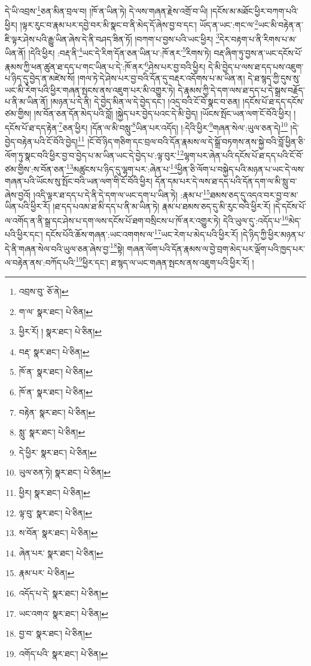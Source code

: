 དེ་ཡི་འབྲས་\footnote{འབྲས་བུ་  ཅོ་ནེ། }ཅན་མིན་བྲལ་བ། །ཁོ་ན་ཡིན་ཏེ། དེ་ལས་གཞན་རྗེས་འགྲོ་བ་ཡི། །དངོས་མ་མཐོང་ཕྱིར་བཀག་པའི་ཕྱིར། །ལྟར་རུང་བ་རྣམ་པར་དབྱེ་བར་མི་སྣང་བ་ནི་མེད་དོ་ཞེས་བྱ་བ་དང་། ཡོད་ན་ཡང་:གང་ལ་\footnote{ག་ལ་  སྣར་ཐང་།  པེ་ཅིན། }ཡང་མི་བརྟེན་ན་ཇི་ལྟར་ཤེས་པའི་རྒྱུ་ཡིན་ཞེས་དེ་ནི་བཤད་ཟིན་ཏོ། །བཀག་པ་བྱས་པའི་ཡང་ཕྱིར། \footnote{ཕྱིར་རོ། །   སྣར་ཐང་།  པེ་ཅིན། }དེར་བརྟག་པ་ནི་རིགས་པ་མ་ཡིན་ནོ། །དེའི་ཕྱིར། :བརྡ་ནི་\footnote{བརྡ་  སྣར་ཐང་།  པེ་ཅིན། }ཡང་དེ་རིག་དོན་ཅན་ཡིན་པ་:ཁོ་ནར་\footnote{ཁོ་ན་  སྣར་ཐང་།  པེ་ཅིན། }རིགས་ཏེ། བརྡ་ཞིག་ཏུ་བྱས་ན་ཡང་དངོས་པོ་རྣམས་ཀྱི་ཕན་ཚུན་ཐ་དད་པ་གང་ཡིན་པ་དེ་:ཁོ་ནར་\footnote{ཁོ་ན་  སྣར་ཐང་།  པེ་ཅིན། }ཤེས་པར་བྱ་བའི་ཕྱིར། དེ་མི་བྱེད་པ་ལས་ཐ་དད་པས་འཇུག་པ་ཉིད་དུ་བྱེད་ན་མཛེས་སོ། །གལ་ཏེ་དེ་ཤེས་པར་བྱ་བའི་དོན་དུ་བརྡར་འདོགས་པ་མ་ཡིན་ན། དེ་ཐ་སྙད་ཀྱི་དུས་སུ་ཡང་མི་རེག་པའི་ཕྱིར་གཞན་སྤངས་ནས་འཇུག་པར་མི་འགྱུར་ཏེ། དེ་རྣམས་ཀྱི་དེ་དག་ལས་ཐ་དད་པ་དེ་སྒྲས་བརྗོད་པ་ནི་མ་ཡིན་ནོ། །མཉན་པ་དེ་ནི། དེ་བྱེད་མིན་ལ་དེ་བྱེད་དང་། །འདྲ་བའི་ངོ་བོ་སྣང་བ་ཅན། །དངོས་པོ་ཐ་དད་དངོས་ཙམ་གྱིས། །ས་བོན་ཅན་དོན་མེད་པའི་བློ། །སྐྱེད་པར་བྱེད་པའང་དེ་མི་བྱེད། །ཡོངས་སྤོང་ཡན་ལག་ངོ་བོའི་ཕྱིར། །དངོས་པོ་ཐ་དད་རྟེན་\footnote{བརྟེན་  སྣར་ཐང་།  པེ་ཅིན། }ཅན་ཕྱིར། །དོན་ལ་མི་བསླུ་\footnote{སླུ་  སྣར་ཐང་།  པེ་ཅིན། }ཡིན་པར་འདོད། །:དེའི་ཕྱིར་\footnote{དེ་ཕྱིར་  སྣར་ཐང་།  པེ་ཅིན། }གཞན་སེལ་:ཡུལ་ཅན་དེ།\footnote{ཡུལ་ཅན་ཏེ།  སྣར་ཐང་།  པེ་ཅིན། } །དེ་བྱེད་བརྟེན་པའི་ངོ་བོའི་བྱེད།\footnote{ཕྱིར།  སྣར་ཐང་།  པེ་ཅིན། } །ངོ་བོ་ཉིད་གཅིག་དང་བྲལ་བའི་དོན་རྣམས་ལ་དེ་སྒྲོ་བཏགས་ནས་སྐྱེ་བའི་བློ་ཕྱིན་ཅི་ལོག་ཏུ་སྣང་བའི་ཕྱིར་བྱ་བ་བྱེད་པ་མ་ཡིན་ཡང་དེ་བྱེད་པ་:ལྟ་བུར་\footnote{ལྟ་བུ་  སྣར་ཐང་།  པེ་ཅིན། }ལྷག་པར་ཞེན་པའི་དངོས་པོ་ཐ་དད་པའི་ངོ་བོ་ཙམ་གྱིས་:ས་བོན་ཅན་\footnote{ས་བོན་  སྣར་ཐང་།  པེ་ཅིན། }མཚུངས་པ་ཉིད་དུ་ལྷག་པར་:ཞེན་པ་\footnote{ཞེན་པར་  སྣར་ཐང་།  པེ་ཅིན། }ཕྱིན་ཅི་ལོག་པ་བསྐྱེད་པའི་མཉན་པ་ཡང་དེ་ལས་གཞན་པའི་ཡོངས་སུ་སྤོང་བའི་ཡན་ལག་གི་ངོ་བོའི་ཕྱིར། དོན་དམ་པར་དེ་ལས་ཐ་དད་པའི་དོན་དག་ལ་མི་སླུ་བ་ཞེས་བྱའོ། །འདི་ལྟར་ཐ་དད་པ་དེ་ནི་དེ་དག་ལ་ཡང་དག་པ་ཡིན་ཏེ། :རྣམ་པ་\footnote{རྣམ་པར་  པེ་ཅིན། }ཐམས་ཅད་དུ་འདའ་བར་བྱ་བ་མ་ཡིན་པའི་ཕྱིར་རོ། །ཐ་དད་པའམ་ཐ་མི་དད་པ་ནི་མ་ཡིན་ཏེ། རྣམ་པ་ཐམས་ཅད་དུ་མི་རུང་བའི་ཕྱིར་རོ། །དེ་དངོས་པོ་ལ་འགོད་ན་ནི་སྒྲ་དང་ཤེས་པ་དག་ལས་དངོས་པོ་ཐག་བསྲིངས་པ་ཁོ་ནར་འགྱུར་ཏེ། དེའི་ཡུལ་དུ་:འདོད་པ་\footnote{འདོད་པ་དེ་  སྣར་ཐང་།  པེ་ཅིན། }མེད་པའི་ཕྱིར་དང་། དངོས་པོའི་ཆོས་གཞན་:ཡང་འགགས་ལ་\footnote{ཡང་འགའ་  སྣར་ཐང་།  པེ་ཅིན། }ཡང་རེག་པ་མེད་པའི་ཕྱིར་རོ། །དེ་ཉིད་ཀྱི་ཕྱིར་མཉན་པ་དེ་ནི་གཞན་སེལ་བའི་ཡུལ་ཅན་ཞེས་བྱ་\footnote{བྱ་བ་  སྣར་ཐང་།  པེ་ཅིན། }སྟེ། གཞན་ལོག་པའི་དོན་རྣམས་ལ་བྱེ་བྲག་མེད་པར་ལྡོག་པའི་ཁྱད་པར་ལ་བརྟེན་ནས་:བཀོད་པའི་\footnote{འགོད་པའི་  སྣར་ཐང་།  པེ་ཅིན། }ཕྱིར་དང་། ཐ་སྙད་ལ་ཡང་གཞན་སྤངས་ནས་འཇུག་པའི་ཕྱིར་རོ། །
